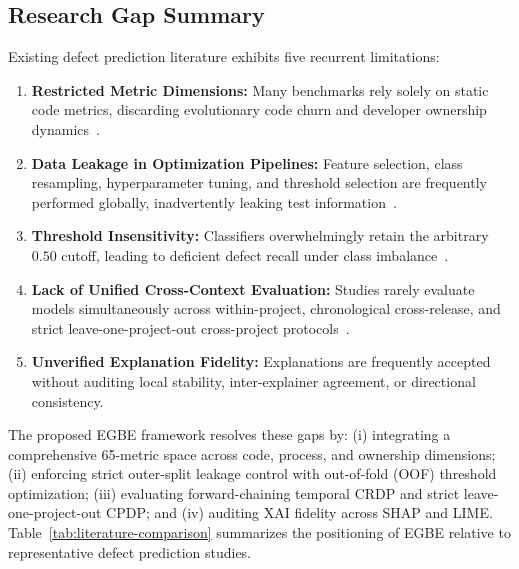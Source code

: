 \documentclass[conference]{IEEEtran}
\begin{document}
\subsection{Research Gap Summary}
Existing defect prediction literature exhibits five recurrent limitations:
\begin{enumerate}
    \item \textbf{Restricted Metric Dimensions:} Many benchmarks rely solely on static code metrics, discarding evolutionary code churn and developer ownership dynamics~\cite{ali2023featureselection, li2025modelaveraging}.
    \item \textbf{Data Leakage in Optimization Pipelines:} Feature selection, class resampling, hyperparameter tuning, and threshold selection are frequently performed globally, inadvertently leaking test information~\cite{tantithamthavorn2019optimization}.
    \item \textbf{Threshold Insensitivity:} Classifiers overwhelmingly retain the arbitrary $0.50$ cutoff, leading to deficient defect recall under class imbalance~\cite{chicco2020mcc}.
    \item \textbf{Lack of Unified Cross-Context Evaluation:} Studies rarely evaluate models simultaneously across within-project, chronological cross-release, and strict leave-one-project-out cross-project protocols~\cite{yatish2019affected, sottomayor2024survey}.
    \item \textbf{Unverified Explanation Fidelity:} Explanations are frequently accepted without auditing local stability, inter-explainer agreement, or directional consistency.
\end{enumerate}

The proposed EGBE framework resolves these gaps by: (i) integrating a comprehensive 65-metric space across code, process, and ownership dimensions; (ii) enforcing strict outer-split leakage control with out-of-fold (OOF) threshold optimization; (iii) evaluating forward-chaining temporal CRDP and strict leave-one-project-out CPDP; and (iv) auditing XAI fidelity across SHAP and LIME. Table~\ref{tab:literature-comparison} summarizes the positioning of EGBE relative to representative defect prediction studies.
\end{document}
